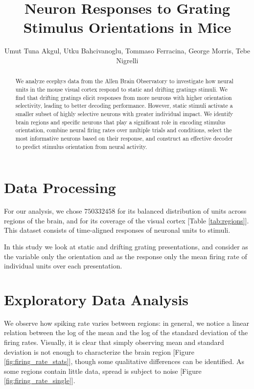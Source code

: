 \documentclass[10pt,twocolumn]{article}
\title{\Large \textbf{Neuron Responses to Grating Stimulus Orientations in Mice}}
\author{
  Umut Tuna Akgul, Utku Bahcivanoglu, Tommaso Ferracina, George Morris, Tebe Nigrelli
}
\date{\today\\ [1ex] \hrule}
\begin{document}
\maketitle
\pagestyle{empty}

\begin{abstract}
We analyze ecephys data from the Allen Brain Observatory to investigate how neural units in the mouse visual cortex respond to static and drifting gratings stimuli. We find that drifting gratings elicit responses from more neurons with higher orientation selectivity, leading to better decoding performance. However, static stimuli activate a smaller subset of highly selective neurons with greater individual impact. We identify brain regions and specific neurons that play a significant role in encoding stimulus orientation, combine neural firing rates over multiple trials and conditions, select the most informative neurons based on their response, and construct an effective decoder to predict stimulus orientation from neural activity.
\end{abstract}


\section{Data Processing}

For our analysis, we chose $750332458$ for its balanced distribution of units across regions of the brain, and for its coverage of the visual cortex [Table \ref{tab:regions}].  This dataset consists of time-aligned responses of neuronal units to stimuli.

In this study we look at static and drifting grating presentations, and consider as the variable only the orientation and as the response only the mean firing rate of individual units over each presentation.

\section{Exploratory Data Analysis}

We observe how spiking rate varies between regions: in general, we notice a linear relation between the log of the mean and the log of the standard deviation of the firing rates. Visually, it is clear that simply observing mean and standard deviation is not enough to characterize the brain region [Figure \ref{fig:firing_rate_stats}], though some qualitative differences can be identified. As some regions contain little data, spread is subject to noise [Figure \ref{fig:firing_rate_single}].
\end{document}
